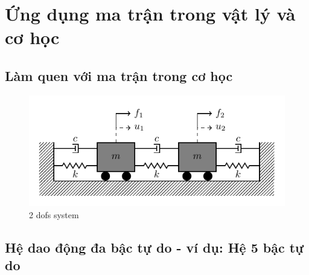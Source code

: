 \section{Ứng dụng ma trận trong vật lý và cơ học}\label{sec_1}

\subsection{Làm quen với ma trận trong cơ học}

\begin{figure}[htbp]
    \centering
    \includegraphics[width=1.\textwidth]{figure/mass_spring_damper_2dofs.pdf}
    \caption{2 dofs system}
    \label{fig:2dofs}
\end{figure}

\lipsum[2-5]
\subsection{Hệ dao động đa bậc tự do - ví dụ: Hệ 5 bậc tự do}
\lipsum[6-15]
